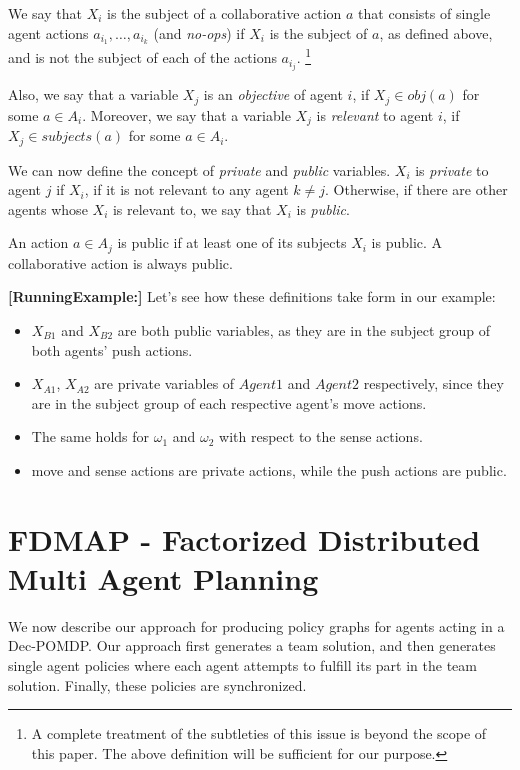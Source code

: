 \documentclass[letterpaper]{article} %
\newcommand{\eliran}[1]{\textbf{[\color{red}ELIRAN:#1]}}
\newcommand{\RE}[1]{\textbf{[\color{purple}RunningExample:#1]}}
\begin{document}
We say that $X_i$ is the subject of a collaborative action $a$ that consists of single agent actions
$a_{i_1},\ldots,a_{i_k}$ (and {\em no-ops}) if $X_i$ is the subject of $a$, as defined above, and is not the subject of each of the actions $a_{i_j}$.%
\footnote{A complete treatment of the subtleties of this issue is beyond the scope of this paper. The above definition will be sufficient for our purpose.}

Also, we say that a variable $X_j$ is an \emph{objective} of agent $i$, if  $X_j\in obj(a)$ for some $a\in A_i$. Moreover, we say that a variable $X_j$ is \emph{relevant} to agent $i$, if $X_j\in subjects(a)$ for some $a\in A_i$. %

We can now define the concept of {\em private} and {\em public} variables.
$X_i$ is {\em private} to agent $j$ if $X_i$, if it is not relevant to any agent $k\neq j$.
Otherwise, if there are other agents whose $X_i$ is relevant to, we say that $X_i$ is {\em public}. 

An action $a\in A_j$ is public if at least one of its subjects $X_i$ is public. A collaborative action is always public.

\RE{}
Let's see how these definitions take form in our example:
\begin{itemize}
    \item $X_{B1}$ and $X_{B2}$ are both public variables, as they are in the subject group of both agents' push actions.
    \item $X_{A1}$, $X_{A2}$ are private variables of $Agent1$ and $Agent2$ respectively, since they are in the subject group of each respective agent's move actions.
    \item The same holds for $\omega_1$ and $\omega_2$ with respect to the sense actions.
    \item move and sense actions are private actions, while the push actions are public.
\end{itemize}

\section{FDMAP - Factorized Distributed Multi Agent Planning}

We now describe our approach for producing policy graphs for agents acting in a Dec-POMDP. Our approach first generates a team solution, and then generates single agent policies where each agent attempts to fulfill its part in the team solution. Finally, these policies are synchronized. 
\end{document}
